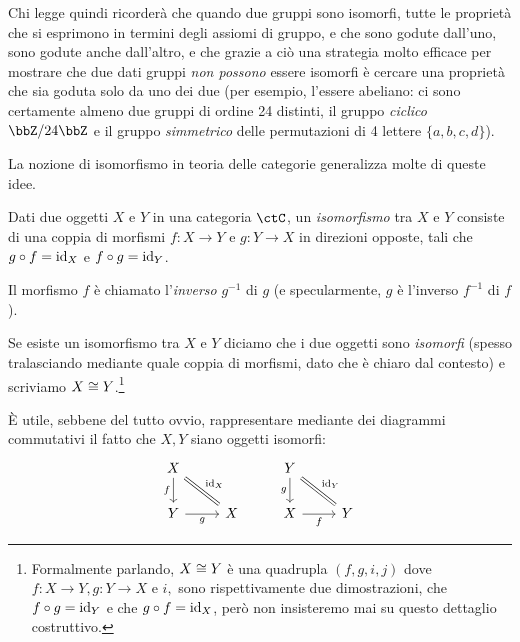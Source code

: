 Chi legge quindi ricorderà che quando due gruppi sono isomorfi, tutte le proprietà che si esprimono in termini degli assiomi di gruppo, e che sono godute dall'uno, sono godute anche dall'altro, e che grazie a ciò una strategia molto efficace per mostrare che due dati gruppi \emph{non possono} essere isomorfi è cercare una proprietà che sia goduta solo da uno dei due (per esempio, l'essere abeliano: ci sono certamente almeno due gruppi di ordine 24 distinti, il gruppo \emph{ciclico} \(\bbZ/24\bbZ\) e il gruppo \emph{simmetrico} delle permutazioni di 4 lettere \(\{a,b,c,d\}\)).

La nozione di isomorfismo in teoria delle categorie generalizza molte di queste idee.
\begin{definition}[Isomorfismo]\label{def_isomorfismo}
	Dati due oggetti \(X\) e \(Y\) in una categoria \(\ctC\), un \emph{isomorfismo} tra \(X\) e \(Y\) consiste di una coppia di morfismi \(f:X\to Y\) e \(g:Y\to X\) in direzioni opposte, tali che \(g\circ f=\mathrm{id}_X\) e \(f\circ g=\mathrm{id}_Y\).

	Il morfismo \(f\) è chiamato l'\emph{inverso} \(g^{-1}\) di \(g\) (e specularmente, \(g\) è l'inverso \(f^{-1}\) di \(f\)).

	Se esiste un isomorfismo tra \(X\) e \(Y\) diciamo che i due oggetti sono \emph{isomorfi} (spesso tralasciando mediante quale coppia di morfismi, dato che è chiaro dal contesto) e scriviamo \(X\cong Y\).\footnote{Formalmente parlando, \(X\cong Y\) è una quadrupla \((f,g, i,j)\) dove \(f : X\to Y, g: Y\to X\) e \(i,\) sono rispettivamente due dimostrazioni, che \(f\circ g= \mathrm{id}_Y\) e che \(g\circ f=\mathrm{id}_X\), però non insisteremo mai su questo dettaglio costruttivo.}
\end{definition}
\`E utile, sebbene del tutto ovvio, rappresentare mediante dei diagrammi commutativi il fatto che \(X,Y\) siano oggetti isomorfi: %
\[
	\begin{tikzcd}
		X\ar[d, "f"'] \ar[dr, equal, "\id_X"]& & Y \ar[dr, equal, "\id_Y"]\ar[d,"g"']\\
		Y \ar[r, "g"']& X & X \ar[r, "f"']& Y
	\end{tikzcd}
\]
